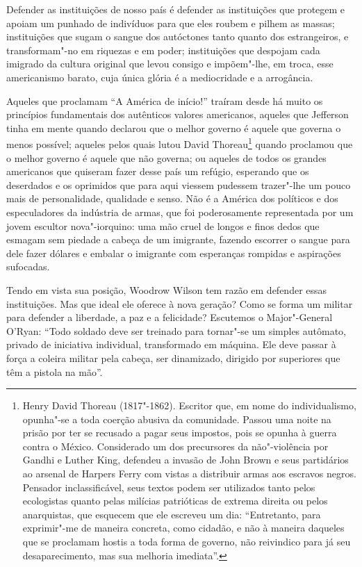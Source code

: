 Defender as instituições de nosso país é defender as instituições que
protegem e apoiam um punhado de indivíduos para que eles roubem e
pilhem as massas; instituições que sugam o sangue dos autóctones tanto
quanto dos estrangeiros, e transformam"-no em riquezas e em poder;
instituições que despojam cada imigrado da cultura original que levou
consigo e impõem"-lhe, em troca, esse americanismo barato, cuja única
glória é a mediocridade e a arrogância.

Aqueles que proclamam “A América de início!” traíram desde há muito os
princípios fundamentais dos autênticos valores americanos, aqueles que
Jefferson tinha em mente quando declarou que o melhor governo é aquele
que governa o menos possível; aqueles pelos quais lutou David Thoreau\footnote{
Henry David Thoreau (1817"-1862). Escritor que, em nome do
individualismo, opunha"-se a toda coerção abusiva da comunidade.
Passou uma noite na prisão por ter se recusado a pagar seus impostos,
pois se opunha à guerra contra o México. Considerado um dos precursores
da não"-violência por Gandhi e Luther King, defendeu a invasão de John
Brown e seus partidários ao arsenal de Harpers Ferry com vistas a
distribuir armas aos escravos negros. Pensador inclassificável, seus
textos podem ser utilizados tanto pelos ecologistas quanto pelas
milícias patrióticas de extrema direita ou pelos anarquistas, que
esquecem que ele escreveu um dia: “Entretanto, para exprimir"-me de
maneira concreta, como cidadão, e não à maneira daqueles que se
proclamam hostis a toda forma de governo, não reivindico para já seu
desaparecimento, mas sua melhoria imediata”.}
quando proclamou que o melhor governo é aquele que não governa; ou
aqueles de todos os grandes americanos que quiseram fazer desse país um
refúgio, esperando que os deserdados e os oprimidos que para aqui
viessem pudessem trazer"-lhe um pouco mais de personalidade,
qualidade e senso. Não é a América dos políticos e dos especuladores da
indústria de armas, que foi poderosamente representada por um
jovem escultor nova"-iorquino: uma mão cruel de longos e finos dedos
que esmagam sem piedade a cabeça de um imigrante, fazendo escorrer o
sangue para dele fazer dólares e embalar o imigrante com esperanças
rompidas e aspirações sufocadas.

Tendo em vista sua posição, Woodrow Wilson tem razão em defender essas
instituições. Mas que ideal ele oferece à nova geração? Como se forma
um militar para defender a liberdade, a paz e a felicidade? Escutemos o
Major"-General O’Ryan: “Todo soldado deve ser treinado para
tornar"-se um simples autômato, privado de iniciativa individual,
transformado em máquina. Ele deve passar à força a coleira
militar pela cabeça, ser dinamizado, dirigido por superiores que têm a pistola na
mão”.


